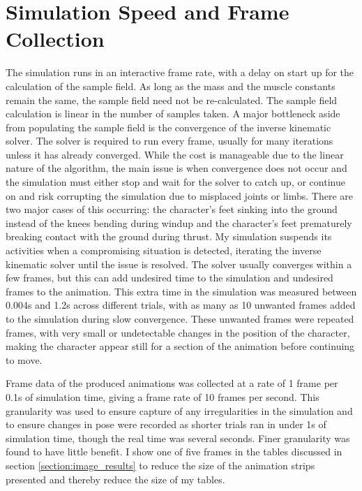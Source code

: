 \section{Simulation Speed and Frame Collection}
\label{section:speed_frame_results}
The simulation runs in an interactive frame rate, with a delay on start up for the calculation of the sample field.  As long as the mass and the muscle constants remain the same, the sample field need not be re-calculated.  The sample field calculation is linear in the number of samples taken.  A major bottleneck aside from populating the sample field is the convergence of the inverse kinematic solver.  The solver is required to run every frame, usually for many iterations unless it has already converged.  While the cost is manageable due to the linear nature of the algorithm, the main issue is when convergence does not occur and the simulation must either stop and wait for the solver to catch up, or continue on and risk corrupting the simulation due to misplaced joints or limbs.  There are two major cases of this occurring: the character's feet sinking into the ground instead of the knees bending during windup and the character's feet prematurely breaking contact with the ground during thrust.  My simulation suspends its activities when a compromising situation is detected, iterating the inverse kinematic solver until the issue is resolved.  The solver usually converges within a few frames, but this can add undesired time to the simulation and undesired frames to the animation.  This extra time in the simulation was measured between 0.004s and 1.2s across different trials, with as many as 10 unwanted frames added to the simulation during slow convergence.  These unwanted frames were repeated frames, with very small or undetectable changes in the position of the character, making the character appear still for a section of the animation before continuing to move.

Frame data of the produced animations was collected at a rate of 1 frame per 0.1s of simulation time, giving a frame rate of 10 frames per second.  This granularity was used to ensure capture of any irregularities in the simulation and to ensure changes in pose were recorded as shorter trials ran in under 1s of simulation time, though the real time was several seconds.  Finer granularity was found to have little benefit.  I show one of five frames in the tables discussed in section \ref{section:image_results} to reduce the size of the animation strips presented and thereby reduce the size of my tables.

